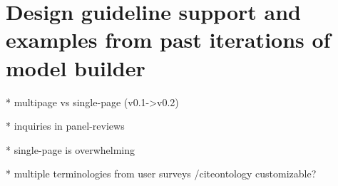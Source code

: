 \section{Design guideline support and examples from past iterations of model builder}

* multipage vs single-page (v0.1->v0.2)

* inquiries in panel-reviews

* single-page is overwhelming 

* multiple terminologies from user surveys /cite{ontology} customizable? 
